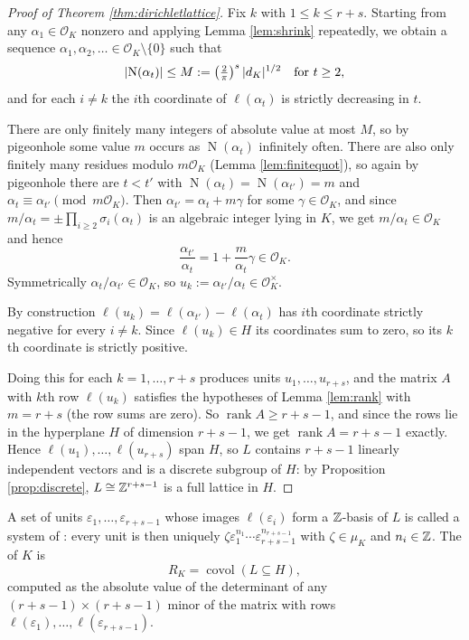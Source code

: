 \documentclass[a4paper]{scrartcl}
\renewcommand{\OO}{\mathcal{O}}
\newcommand{\Nm}{\operatorname{N}}
\newcommand{\covol}{\operatorname{covol}}
\newcommand{\rank}{\operatorname{rank}}
\begin{document}
\begin{proof}[Proof of Theorem \ref{thm:dirichletlattice}]
	Fix $k$ with $1 \le k \le r+s$. Starting from any $\alpha_1 \in \OO_K$ nonzero and applying Lemma \ref{lem:shrink} repeatedly, we obtain a sequence $\alpha_1,\alpha_2,\dots \in \OO_K\setminus\{0\}$ such that
	$$\abs{\Nm(\alpha_t)} \le M := \left(\tfrac2\pi\right)^{s}\abs{d_K}^{1/2}\quad\text{for } t \geq 2,$$
	and for each $i \neq k$ the $i$th coordinate of $\ell(\alpha_t)$ is strictly decreasing in $t$.

	There are only finitely many integers of absolute value at most $M$, so by pigeonhole some value $m$ occurs as $\Nm(\alpha_t)$ infinitely often. There are also only finitely many residues modulo $m\OO_K$ (Lemma \ref{lem:finitequot}), so again by pigeonhole there are $t < t'$ with $\Nm(\alpha_t) = \Nm(\alpha_{t'}) = m$ and $\alpha_t \equiv \alpha_{t'} \pmod{m\OO_K}$. Then $\alpha_{t'} = \alpha_t + m\gamma$ for some $\gamma \in \OO_K$, and since $m/\alpha_t = \pm\prod_{i\ge2}\sigma_i(\alpha_t)$ is an algebraic integer lying in $K$, we get $m/\alpha_t \in \OO_K$ and hence
	$$\frac{\alpha_{t'}}{\alpha_t} = 1 + \frac{m}{\alpha_t}\gamma \in \OO_K.$$
	Symmetrically $\alpha_t/\alpha_{t'} \in \OO_K$, so $u_k := \alpha_{t'}/\alpha_t \in \OO_K^\times$.

	By construction $\ell(u_k) = \ell(\alpha_{t'}) - \ell(\alpha_t)$ has $i$th coordinate strictly negative for every $i \neq k$. Since $\ell(u_k) \in H$ its coordinates sum to zero, so its $k$th coordinate is strictly positive.

	Doing this for each $k = 1,\dots,r+s$ produces units $u_1,\dots,u_{r+s}$, and the matrix $A$ with $k$th row $\ell(u_k)$ satisfies the hypotheses of Lemma \ref{lem:rank} with $m = r+s$ (the row sums are zero). So $\rank A \geq r+s-1$, and since the rows lie in the hyperplane $H$ of dimension $r+s-1$, we get $\rank A = r+s-1$ exactly. Hence $\ell(u_1),\dots,\ell(u_{r+s})$ span $H$, so $L$ contains $r+s-1$ linearly independent vectors and is a discrete subgroup of $H$: by Proposition \ref{prop:discrete}, $L \cong \mathbb{Z}^{r+s-1}$ is a full lattice in $H$.
\end{proof}

\begin{definition}
	A set of units $\varepsilon_1,\dots,\varepsilon_{r+s-1}$ whose images $\ell(\varepsilon_i)$ form a $\mathbb{Z}$-basis of $L$ is called a system of : every unit is then uniquely $\zeta\varepsilon_1^{n_1}\cdots\varepsilon_{r+s-1}^{n_{r+s-1}}$ with $\zeta \in \mu_K$ and $n_i\in\mathbb{Z}$. The  of $K$ is
	$$R_K = \covol\left(L \subseteq H\right),$$
	computed as the absolute value of the determinant of any $(r+s-1)\times(r+s-1)$ minor of the matrix with rows $\ell(\varepsilon_1),\dots,\ell(\varepsilon_{r+s-1})$.
\end{definition}
\end{document}
